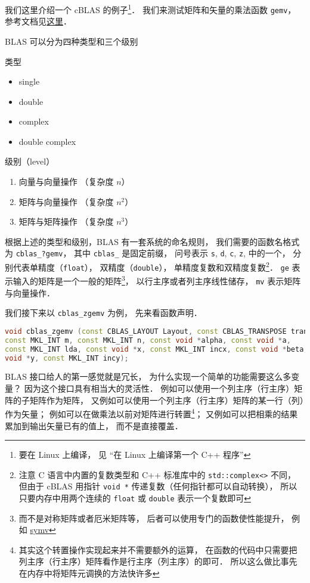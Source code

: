 我们这里介绍一个 cBLAS 的例子\footnote{要在 Linux 上编译， 见 “在 Linux 上编译第一个 C++ 程序”}． 我们来测试矩阵和矢量的乘法函数 \verb|gemv|， 参考文档见\href{https://software.intel.com/en-us/node/834919#88940C4E-0889-46C3-B6CF-F8B6EA6CF4BC}{这里}．

BLAS 可以分为四种类型和三个级别

类型
\begin{itemize}
    \item single
    \item double
    \item complex
    \item double complex
\end{itemize}

级别（level）
\begin{enumerate}
    \item 向量与向量操作 （复杂度 $n$）
    \item 矩阵与向量操作 （复杂度 $n^2$）
    \item 矩阵与矩阵操作 （复杂度 $n^3$）
\end{enumerate}

根据上述的类型和级别，BLAS 有一套系统的命名规则，
我们需要的函数名格式为 \verb|cblas_?gemv|， 其中 \verb|cblas_| 是固定前缀， 问号表示 \verb|s|, \verb|d|, \verb|c|, \verb|z|, 中的一个， 分别代表单精度（\verb|float|）， 双精度（\verb|double|）， 单精度复数和双精度复数\footnote{注意 C 语言中内置的复数类型和 C++ 标准库中的 \lstinline|std::complex<>| 不同， 但由于 cBLAS 用指针 \lstinline|void *| 传递复数（任何指针都可以自动转换）， 所以只要内存中用两个连续的 \lstinline|float| 或 \lstinline|double| 表示一个复数即可}． \verb|ge| 表示输入的矩阵是一个一般的矩阵\footnote{而不是对称矩阵或者厄米矩阵等， 后者可以使用专门的函数使性能提升， 例如 \href{https://software.intel.com/en-us/node/834934}{symv}}， 以行主序或者列主序线性储存， \lstinline|mv| 表示矩阵与向量操作． 



我们接下来以 \verb|cblas_zgemv| 为例， 先来看函数声明．
\begin{lstlisting}[language=cpp]
void cblas_zgemv (const CBLAS_LAYOUT Layout, const CBLAS_TRANSPOSE trans,
const MKL_INT m, const MKL_INT n, const void *alpha, const void *a,
const MKL_INT lda, const void *x, const MKL_INT incx, const void *beta,
void *y, const MKL_INT incy);
\end{lstlisting}

BLAS 接口给人的第一感觉就是冗长， 为什么实现一个简单的功能需要这么多变量？ 因为这个接口具有相当大的灵活性． 例如可以使用一个列主序（行主序）矩阵的子矩阵作为矩阵， 又例如可以使用一个列主序（行主序）矩阵的某一行（列）作为矢量； 例如可以在做乘法以前对矩阵进行转置\footnote{其实这个转置操作实现起来并不需要额外的运算， 在函数的代码中只需要把列主序（行主序）矩阵看作是行主序（列主序）的即可． 所以这么做比事先在内存中将矩阵元调换的方法快许多}； 又例如可以把相乘的结果累加到输出矢量已有的值上， 而不是直接覆盖．

